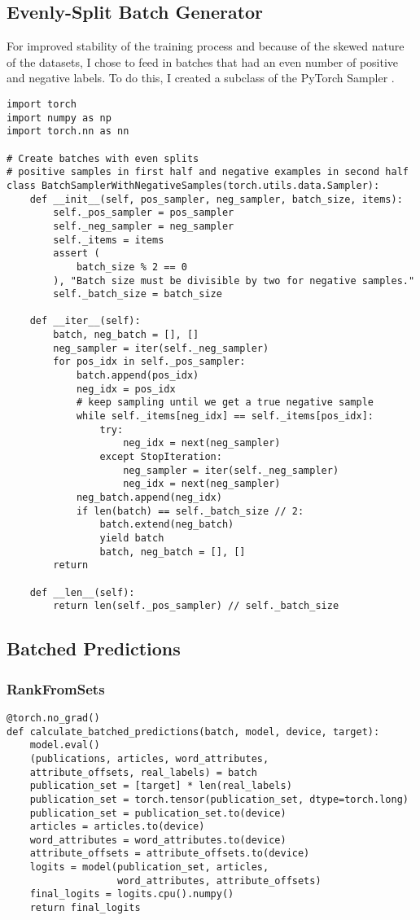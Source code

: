 \subsection{Evenly-Split Batch Generator}
For improved stability of the training process and because of the skewed nature of the datasets, I chose to feed in batches that had an even number of positive and negative labels. To do this, I created a subclass of the PyTorch Sampler \parencite{NEURIPS2019_9015}.
\begin{verbatim}
import torch
import numpy as np
import torch.nn as nn

# Create batches with even splits
# positive samples in first half and negative examples in second half
class BatchSamplerWithNegativeSamples(torch.utils.data.Sampler):
    def __init__(self, pos_sampler, neg_sampler, batch_size, items):
        self._pos_sampler = pos_sampler
        self._neg_sampler = neg_sampler
        self._items = items
        assert (
            batch_size % 2 == 0
        ), "Batch size must be divisible by two for negative samples."
        self._batch_size = batch_size

    def __iter__(self):
        batch, neg_batch = [], []
        neg_sampler = iter(self._neg_sampler)
        for pos_idx in self._pos_sampler:
            batch.append(pos_idx)
            neg_idx = pos_idx
            # keep sampling until we get a true negative sample
            while self._items[neg_idx] == self._items[pos_idx]:
                try:
                    neg_idx = next(neg_sampler)
                except StopIteration:
                    neg_sampler = iter(self._neg_sampler)
                    neg_idx = next(neg_sampler)
            neg_batch.append(neg_idx)
            if len(batch) == self._batch_size // 2:
                batch.extend(neg_batch)
                yield batch
                batch, neg_batch = [], []
        return

    def __len__(self):
        return len(self._pos_sampler) // self._batch_size

\end{verbatim}

\subsection{Batched Predictions}
\subsubsection{RankFromSets}
\begin{verbatim}
@torch.no_grad()
def calculate_batched_predictions(batch, model, device, target):
    model.eval()
    (publications, articles, word_attributes, 
    attribute_offsets, real_labels) = batch
    publication_set = [target] * len(real_labels)
    publication_set = torch.tensor(publication_set, dtype=torch.long)
    publication_set = publication_set.to(device)
    articles = articles.to(device)
    word_attributes = word_attributes.to(device)
    attribute_offsets = attribute_offsets.to(device)
    logits = model(publication_set, articles, 
    			   word_attributes, attribute_offsets)
    final_logits = logits.cpu().numpy()
    return final_logits
\end{verbatim}

